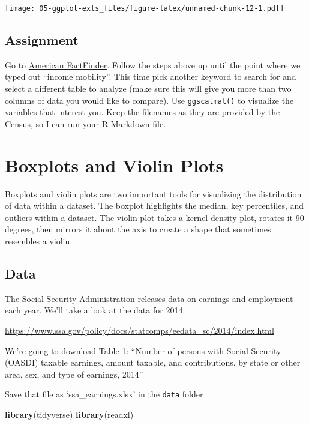 \documentclass[]{book}
\newenvironment{Shaded}{\begin{snugshade}}{\end{snugshade}}
\newcommand{\KeywordTok}[1]{\textcolor[rgb]{0.13,0.29,0.53}{\textbf{{#1}}}}
\newcommand{\NormalTok}[1]{{#1}}
\theoremstyle{definition}
\theoremstyle{definition}
\theoremstyle{remark}
\begin{document}
\texttt{[image: 05-ggplot-exts\_files/figure-latex/unnamed-chunk-12-1.pdf]}

\section{Assignment}\label{assignment-4}

Go to \href{https://factfinder.census.gov/}{American FactFinder}. Follow
the steps above up until the point where we typed out ``income
mobility''. This time pick another keyword to search for and select a
different table to analyze (make sure this will give you more than two
columns of data you would like to compare). Use \texttt{ggscatmat()} to
visualize the variables that interest you. Keep the filenames as they
are provided by the Census, so I can run your R Markdown file.

\hypertarget{boxplots-and-violins}{\chapter{Boxplots and Violin
Plots}\label{boxplots-and-violins}}

Boxplots and violin plots are two important tools for visualizing the
distribution of data within a dataset. The boxplot highlights the
median, key percentiles, and outliers within a dataset. The violin plot
takes a kernel density plot, rotates it 90 degrees, then mirrors it
about the axis to create a shape that sometimes resembles a violin.

\section{Data}\label{data-3}

The Social Security Administration releases data on earnings and
employment each year. We'll take a look at the data for 2014:

\url{https://www.ssa.gov/policy/docs/statcomps/eedata_sc/2014/index.html}

We're going to download Table 1: ``Number of persons with Social
Security (OASDI) taxable earnings, amount taxable, and contributions, by
state or other area, sex, and type of earnings, 2014''

Save that file as `ssa\_earnings.xlsx' in the \texttt{data} folder

\begin{Shaded}
\begin{Highlighting}[]
\KeywordTok{library}\NormalTok{(tidyverse)}
\KeywordTok{library}\NormalTok{(readxl)}
\end{Highlighting}
\end{Shaded}
\end{document}
